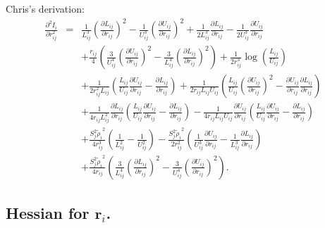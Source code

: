 \documentclass[12pt]{article}
\begin{document}
Chris's derivation:
\begin{eqnarray}
\label{eq:BurialTerm2ndDerv2}
\frac{\partial^{2}I_{i}}{\partial r_{ij}^{2}} & = & 
\frac{1}{L_{ij}^{3}}\left(\frac{\partial L_{ij}}{\partial r_{ij}}\right)^{2} - \frac{1}{U_{ij}^{3}}\left(\frac{\partial U_{ij}}{\partial r_{ij}}\right)^{2}
+\frac{1}{2L_{ij}^{3}}\frac{\partial L_{ij}}{\partial r_{ij}} - \frac{1}{2U_{ij}^{3}}\frac{\partial U_{ij}}{\partial r_{ij}} \nonumber \\
&& + \frac{r_{ij}}{4}\left(\frac{3}{U_{ij}^{4}}\left(\frac{\partial U_{ij}}{\partial r_{ij}} \right)^{2}    - \frac{3}{L_{ij}^{4}}\left(\frac{\partial L_{ij}}{\partial r_{ij}} \right)^{2} \right) 
+ \frac{1}{2r_{ij}^{3}}\log\left(\frac{L_{ij}}{U_{ij}}\right) \nonumber \\
&& + \frac{1}{2r_{ij}^2L_{ij}}\left(  \frac{L_{ij}}{U_{ij}}\frac{\partial U_{ij}}{\partial r_{ij}} - \frac{\partial L_{ij}}{\partial r_{ij}} \right)
+ \frac{1}{2r_{ij}L_{ij}U_{ij}}\left(  \frac{L_{ij}}{U_{ij}}\left(\frac{\partial U_{ij}}{\partial r_{ij}}\right)^2-\frac{\partial U_{ij}}{\partial r_{ij}}  \frac{\partial L_{ij}}{\partial r_{ij}} \right) \nonumber \\
&& + \frac{1}{4r_{ij}L_{ij}^2}\frac{\partial L_{ij}}{\partial r_{ij}} \left(  \frac{L_{ij}}{U_{ij}}\frac{\partial U_{ij}}{\partial r_{ij}} - \frac{\partial L_{ij}}{\partial r_{ij}} \right)
- \frac{1}{4r_{ij}L_{ij}U_{ij}}\frac{\partial U_{ij}}{\partial r_{ij}} \left(  \frac{L_{ij}}{U_{ij}}\frac{\partial U_{ij}}{\partial r_{ij}} - \frac{\partial L_{ij}}{\partial r_{ij}} \right) \nonumber \\
&& + \frac{S_{j}^{2}{{\tilde{\rho}_{i}}}^{2}}{4r_{ij}^{3}}\left(\frac{1}{L_{ij}^2} - \frac{1}{U_{ij}^2} \right)
-\frac{S_{j}^{2}{{\tilde{\rho}_{i}}}^{2}}{2r_{ij}^{2}}\left( \frac{1}{U_{ij}^{3}}\frac{\partial U_{ij}}{\partial r_{ij}}
- \frac{1}{L_{ij}^{3}}\frac{\partial L_{ij}}{\partial r_{ij}}\right) \nonumber \\
&& + \frac{S_{j}^{2}{{\tilde{\rho}_{i}}}^{2}}{4r_{ij}}\left(\frac{3}{L_{ij}^{4}} \left(\frac{\partial L_{ij}}{\partial r_{ij}} \right)^{2} 
 - \frac{3}{U_{ij}^{4}} \left(\frac{\partial U_{ij}}{\partial r_{ij}} \right)^{2} \right).
\end{eqnarray}


\subsection*{Hessian for $\mathbf{r}_i$.}
\end{document}
